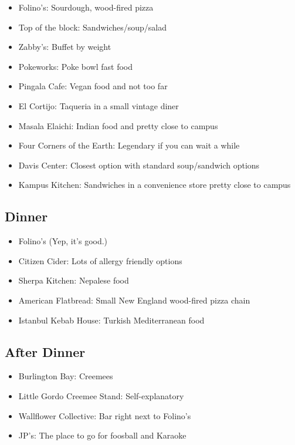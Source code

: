 \begin{itemize}
    \item Folino's: Sourdough, wood-fired pizza
    \item Top of the block: Sandwiches/soup/salad
    \item Zabby's: Buffet by weight
    \item Pokeworks: Poke bowl fast food
    \item Pingala Cafe: Vegan food and not too far
    \item El Cortijo: Taqueria in a small vintage diner
    \item Masala Elaichi: Indian food and pretty close to campus
    \item Four Corners of the Earth: Legendary if you can wait a while
    \item Davis Center: Closest option with standard soup/sandwich options
    \item Kampus Kitchen: Sandwiches in a convenience store pretty close to campus
\end{itemize}

\subsection{Dinner}

\begin{itemize}
    \item Folino's (Yep, it's good.)
    \item Citizen Cider: Lots of allergy friendly options
    \item Sherpa Kitchen: Nepalese food
    \item American Flatbread: Small New England wood-fired pizza chain
    \item Istanbul Kebab House: Turkish Mediterranean food
\end{itemize}

\subsection{After Dinner}

\begin{itemize}
    \item Burlington Bay: Creemees
    \item Little Gordo Creemee Stand: Self-explanatory
    \item Wallflower Collective: Bar right next to Folino's
    \item JP's: The place to go for foosball and Karaoke
\end{itemize}

